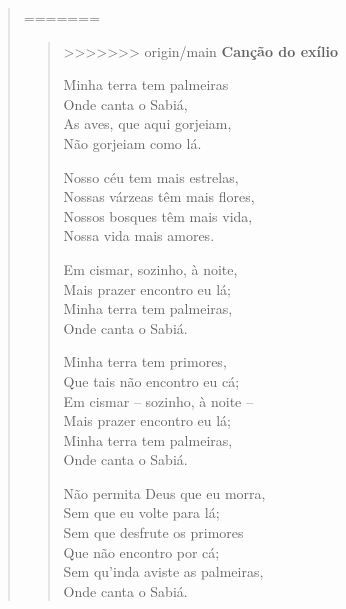 \begin{quote}
=======
\begin{minipage}{.5\textwidth}
\begin{verse}
>>>>>>> origin/main
\textbf{Canção do exílio}

Minha terra tem palmeiras\\
Onde canta o Sabiá,\\
As aves, que aqui gorjeiam,\\
Não gorjeiam como lá.

Nosso céu tem mais estrelas,\\
Nossas várzeas têm mais flores,\\
Nossos bosques têm mais vida,\\
Nossa vida mais amores.

Em cismar, sozinho, à noite,\\
Mais prazer encontro eu lá;\\
Minha terra tem palmeiras,\\
Onde canta o Sabiá.

Minha terra tem primores,\\
Que tais não encontro eu cá;\\
Em cismar -- sozinho, à noite --\\
Mais prazer encontro eu lá;\\
Minha terra tem palmeiras,\\
Onde canta o Sabiá.

Não permita Deus que eu morra,\\
Sem que eu volte para lá;\\
Sem que desfrute os primores\\
Que não encontro por cá;\\
Sem qu'inda aviste as palmeiras,\\
Onde canta o Sabiá.


\end{verse}
\end{minipage}
\end{quote}
